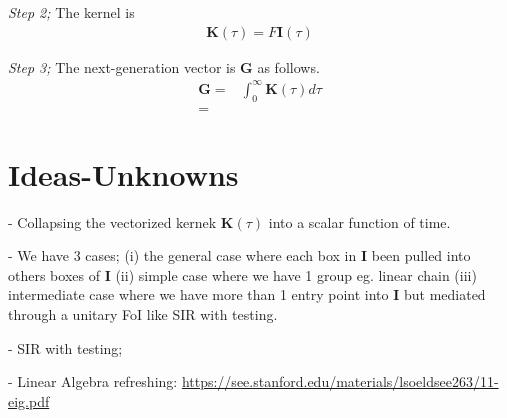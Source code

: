 \documentclass[12pt]{article}
\DeclareRobustCommand\_{\ifmmode\expandafter\subtxt\else\textunderscore\fi}
\renewcommand{\vec}[1]{\ensuremath{\mathbf{#1}}} %
\theoremstyle{definition} %
\begin{document}
{\it Step 2;} The kernel is
\begin{align}
\vec K(\tau)= F \vec I(\tau)
\end{align}

{\it Step 3;} The next-generation vector is $\vec G$ as follows.
\begin{align}
\vec G=&\int_0^\infty \vec K(\tau) d\tau\\
=&
\end{align}
\section{Ideas-Unknowns}
- Collapsing the vectorized kernek $\vec K(\tau)$ into a scalar function of time.

- We have 3 cases; (i) the general case where each box in $\vec I$ been pulled into others boxes of $\vec I$  (ii) simple case where we have 1 group eg. linear chain (iii) intermediate case where we have more than 1 entry point into $\vec I$ but mediated through a unitary FoI like SIR with testing. 

- SIR with testing; 

- Linear Algebra refreshing: \url{https://see.stanford.edu/materials/lsoeldsee263/11-eig.pdf}


\end{document}

